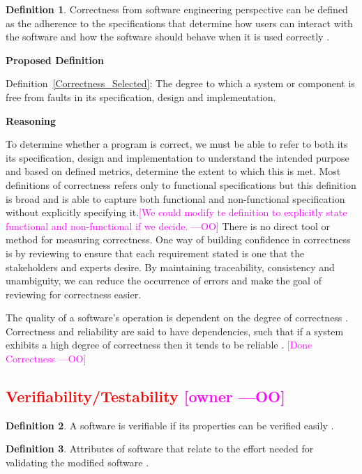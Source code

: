 \documentclass[letterpaper,cleveref]{lipics-v2019}
\newcommand{\authornote}[3]{\textcolor{#1}{[#3 ---#2]}}
\newcommand{\authornote}[3]{}
\newcommand{\oo}[1]{\authornote{magenta}{OO}{#1}} %
\newcommand{\notdone}[1]{\textcolor{red}{#1}}
\theoremstyle{definition}
\newtheorem{defn}{Definition}
\begin{document}
\begin{defn}
  Correctness from software engineering perspective can be defined as the
  adherence to the specifications that determine how users can interact with the
  software and how the software should behave when it is used correctly
  \citep{Tutorialspoint}.
\end{defn}

\noindent \textbf{Proposed Definition}

Definition~\ref{Correctness_Selected}: The degree to which a system or component
is free from faults in its specification, design and implementation.

\noindent \textbf{Reasoning}

To determine whether a program is correct, we must be able to refer to both its
its specification, design and implementation to understand the intended purpose
and based on defined metrics, determine the extent to which this is met. Most
definitions of correctness refers only to functional specifications but this
definition is broad and is able to capture both functional and non-functional
specification without explicitly specifying it.\oo{We could modify te definition
  to explicitly state functional and non-functional if we decide.}  There is no
direct tool or method for measuring correctness. One way of building confidence
in correctness is by reviewing to ensure that each requirement stated is one
that the stakeholders and experts desire.  By maintaining traceability,
consistency and unambiguity, we can reduce the occurrence of errors and make the
goal of reviewing for correctness easier.

The quality of a software's operation is dependent on the degree of correctness
\citep{berander2005software}. Correctness and reliability are said to have
dependencies, such that if a system exhibits a high degree of correctness then
it tends to be reliable \citep{GhezziEtAl2003}. \oo{Done Correctness}

\subsection{\notdone{Verifiability/Testability} \oo{owner}}

\begin{defn}
  A software is verifiable if its properties can be verified easily
  \citep{GhezziEtAl2003}.
\end{defn}

\begin{defn}
  Attributes of software that relate to the effort needed for validating the
  modified software \citep{iso2001iec}.
\end{defn}
\end{document}
